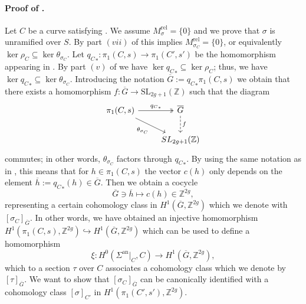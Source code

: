 \documentclass[10 pt,a4paper]{article}
\theoremstyle{plain}
\theoremstyle{definition}
\theoremstyle{named}
\newcommand{\bZ}{\mathbb Z}
\DeclareMathOperator{\an}{an}
\begin{document}
\paragraph{Proof of .}
    Let $C$ be a curve satisfying . We assume $M_\sigma^\textrm{rel}=\{0\}$ and we prove that $\sigma$ is unramified over $S$. By part $(vii)$ of  this implies $M_{\sigma_C}^\textrm{rel}=\{0\}$, or equivalently $\ker{\rho_C}\subseteq \ker{\theta_{\sigma_C}}$. Let ${q_{C}}_\ast:\pi_1(C,s) \to \pi_1(C',s')$ be the homomorphism appearing in . By part $(v)$ of  we have $\ker{{q_{C}}_\ast}\subseteq \ker{\rho_C}$; thus, we have $\ker{{q_{C}}_\ast}\subseteq \ker{\theta_{\sigma_C}}$. Introducing the notation $\overline{G}:={q_{C}}_\ast\pi_1(C,s)$ we obtain that there exists a homomorphism $f:\overline{G}\rightarrow \textrm{SL}_{2g+1}(\bZ)$ such that the diagram
	\begin{equation}\label{factorDiag}
    \begin{tikzcd}
		\pi_1(C,s) \arrow[two heads]{r}{{q_{C}}_\ast} \arrow[swap]{rd}{\theta_{\sigma_C}} & \overline{G} \arrow[dashed]{d}{f}\\
		& \textrm{SL}_{2g+1}(\bZ)
	\end{tikzcd}
    \end{equation}
	commutes; in other words, $\theta_{\sigma_C}$ factors through ${q_{C}}_\ast$. By using the same notation as in , this means that for $h \in \pi_1(C,s)$ the vector $c(h)$ only depends on the element $\overline{h}:={q_{C}}_\ast(h) \in \overline{G}$. Then we obtain a cocycle
    \begin{equation}\label{inducedCocycle}
        \overline{G}\ni \overline{h} \mapsto c(h) \in \bZ^{2g},
    \end{equation}
	representing a certain cohomology class in $H^1(\overline{G},\bZ^{2g})$ which we denote with $[\sigma_C]_{\overline{G}}$. In other words, we have obtained an injective homomorphism $H^1(\pi_1(C,s),\bZ^{2g}) \hookrightarrow H^1(\overline{G},\bZ^{2g})$ which can be used to define a homomorphism
    \[
    \xi: H^0(\Sigma^{\an}|_C,C) \to H^1(\overline{G},\bZ^{2g}),
    \]
    which to a section $\tau$ over $C$ associates a cohomology class which we denote by $[\tau]_{\overline{G}}$. We want to show that $[\sigma_C]_{\overline{G}}$ can be canonically identified with a cohomology class $[\sigma]_{C'}$ in $H^1(\pi_1(C',s'),\bZ^{2g})$.
\end{document}
